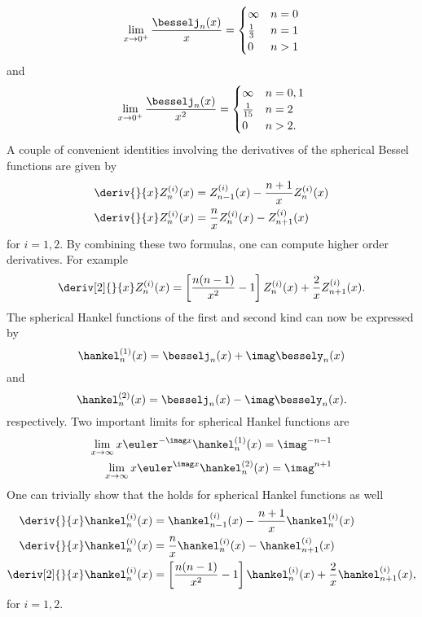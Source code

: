 \begin{equation}\label{Eq1:BesselLimits}
	\lim_{x\to 0^+} \frac{\besselj_n(x)}{x} = \begin{cases} \infty & n = 0\\
	\frac{1}{3} & n = 1\\
	0 & n > 1
	\end{cases}
\end{equation}
and
\begin{equation}\label{Eq1:BesselLimits2}
	\lim_{x\to 0^+} \frac{\besselj_n(x)}{x^2} = \begin{cases} \infty & n = 0,1\\
	\frac{1}{15} & n = 2\\
	0 & n > 2.
	\end{cases}
\end{equation}
A couple of convenient identities involving the derivatives of the spherical Bessel functions are given by~\cite[\href{http://functions.wolfram.com/03.21.20.0007.01}{03.21.20.0007.01} and \href{http://functions.wolfram.com/03.21.20.0007.01}{03.21.20.0008.01}]{WolframResearch2016m}
\begin{align}\label{Eq1:BesselDerivIdentity1}
	\deriv{}{x}Z_n^{(i)}(x) &=  Z_{n-1}^{(i)}(x) -\frac{n+1}{x}Z_n^{(i)}(x)\\
	\deriv{}{x}Z_n^{(i)}(x) &= \frac{n}{x}Z_n^{(i)}(x) - Z_{n+1}^{(i)}(x)\label{Eq1:BesselDerivIdentity2}
\end{align}
for $i=1,2$. By combining these two formulas, one can compute higher order derivatives. For example
\begin{equation}\label{Eq1:BesselDerivIdentity3}
	\deriv[2]{}{x}Z_n^{(i)}(x) =  \left[\frac{n(n-1)}{x^2}-1\right] Z_n^{(i)}(x) + \frac{2}{x}Z_{n+1}^{(i)}(x).
\end{equation}
The spherical Hankel functions of the first and second kind can now be expressed by
\begin{equation}
	\hankel^{(1)}_n(x) = \besselj_n(x) +  \imag \bessely_n(x)
\end{equation}
and 
\begin{equation}
	\hankel^{(2)}_n(x) = \besselj_n(x) -  \imag \bessely_n(x).
\end{equation}
respectively. Two important limits for spherical Hankel functions are~\cite[p. 25]{Ihlenburg1998fea}
\begin{align}
	\lim_{x\to\infty} x\euler^{-\imag x} \hankel^{(1)}_n(x) = \imag^{-n-1}\label{Eq1:sphericalHankelLimit}\\
	\lim_{x\to\infty} x\euler^{\imag x} \hankel^{(2)}_n(x) = \imag^{n+1}
\end{align}
One can trivially show that the  holds for spherical Hankel functions as well
\begin{align}
	\deriv{}{x}\hankel^{(i)}_n(x) &=  \hankel^{(i)}_{n-1}(x) -\frac{n+1}{x}\hankel^{(i)}_n(x)\\
	\deriv{}{x}\hankel^{(i)}_n(x) &= \frac{n}{x}\hankel^{(i)}_n(x) - \hankel^{(i)}_{n+1}(x)\label{Eq1:HankelDerivIdentity2}\\
	\deriv[2]{}{x}\hankel^{(i)}_n(x) &= \left[\frac{n(n-1)}{x^2}-1\right] \hankel^{(i)}_n(x) + \frac{2}{x}\hankel^{(i)}_{n+1}(x),
\end{align}
for $i=1,2$.